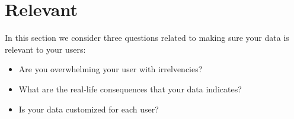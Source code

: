 \section{Relevant}

In this section we consider three questions related to making sure your data is relevant to your users:

\begin{itemize}
    \item Are you overwhelming your user with irrelvencies?
    \item What are the real-life consequences that your data indicates?
    \item Is your data customized for each user?
\end{itemize}



